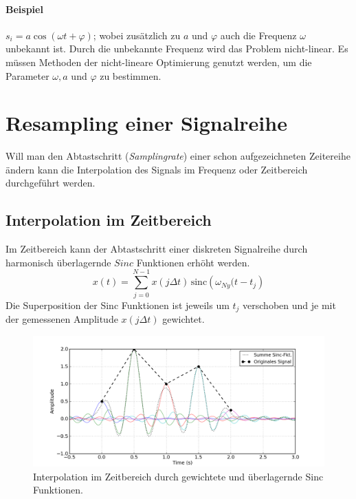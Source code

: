 \begin{enumerate}
\paragraph{Beispiel} $s_i=a \cos(\omega t + \varphi)$; wobei zusätzlich zu $a$ und $\varphi$ auch die Frequenz $\omega$ unbekannt ist. Durch die unbekannte Frequenz wird das Problem nicht-linear. Es müssen Methoden der nicht-lineare Optimierung genutzt werden, um die Parameter $\omega, a$ und $\varphi$ zu bestimmen.
\end{enumerate}

\section{Resampling einer Signalreihe}
Will man den Abtastschritt (\textsl{Samplingrate}) einer schon aufgezeichneten Zeitereihe ändern kann die Interpolation des Signals im Frequenz oder Zeitbereich durchgeführt werden.

\subsection{Interpolation im Zeitbereich}
Im Zeitbereich kann der Abtastschritt einer diskreten Signalreihe durch harmonisch überlagernde $Sinc$ Funktionen erhöht werden.
\begin{equation}
x(t) = \sum_{j=0}^{N-1} x(j \Delta t) \, \mbox{sinc} \left(\omega_{Ny}(t-{t_j}\right)
\end{equation}
Die Superposition der Sinc Funktionen ist jeweils um $t_j$ verschoben und je mit der gemessenen Amplitude $x(j\Delta t)$ gewichtet.

\begin{figure}[h!]
\centering
\includegraphics[width=.9\tw]{fig/03-Resampling/interpolation_sinc.png}
\caption{Interpolation im Zeitbereich durch gewichtete und überlagernde Sinc Funktionen.}
\end{figure}
